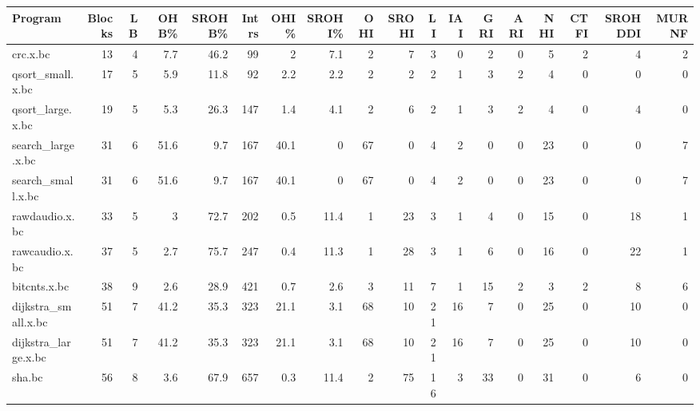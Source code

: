 \begin{tabular}{lrrrrrrrrrrrrrrrrr}
\hline
 Program              &   Blocks &   LB &   OHB\% &   SROHB\% &   Intrs &   OHI\% &   SROHI\% &   OHI &   SROHI &   LI &   IAI &   GRI &   ARI &   NHI &   CTFI &   SROHDDI &   MURNF \\
\hline
 crc.x.bc             &       13 &    4 &    7.7 &     46.2 &      99 &    2   &      7.1 &     2 &       7 &    3 &     0 &     2 &     0 &     5 &      2 &         4 &       2 \\
 qsort\_small.x.bc     &       17 &    5 &    5.9 &     11.8 &      92 &    2.2 &      2.2 &     2 &       2 &    2 &     1 &     3 &     2 &     4 &      0 &         0 &       0 \\
 qsort\_large.x.bc     &       19 &    5 &    5.3 &     26.3 &     147 &    1.4 &      4.1 &     2 &       6 &    2 &     1 &     3 &     2 &     4 &      0 &         4 &       0 \\
 search\_large.x.bc    &       31 &    6 &   51.6 &      9.7 &     167 &   40.1 &      0   &    67 &       0 &    4 &     2 &     0 &     0 &    23 &      0 &         0 &       7 \\
 search\_small.x.bc    &       31 &    6 &   51.6 &      9.7 &     167 &   40.1 &      0   &    67 &       0 &    4 &     2 &     0 &     0 &    23 &      0 &         0 &       7 \\
 rawdaudio.x.bc       &       33 &    5 &    3   &     72.7 &     202 &    0.5 &     11.4 &     1 &      23 &    3 &     1 &     4 &     0 &    15 &      0 &        18 &       1 \\
 rawcaudio.x.bc       &       37 &    5 &    2.7 &     75.7 &     247 &    0.4 &     11.3 &     1 &      28 &    3 &     1 &     6 &     0 &    16 &      0 &        22 &       1 \\
 bitcnts.x.bc         &       38 &    9 &    2.6 &     28.9 &     421 &    0.7 &      2.6 &     3 &      11 &    7 &     1 &    15 &     2 &     3 &      2 &         8 &       6 \\
 dijkstra\_small.x.bc  &       51 &    7 &   41.2 &     35.3 &     323 &   21.1 &      3.1 &    68 &      10 &   21 &    16 &     7 &     0 &    25 &      0 &        10 &       0 \\
 dijkstra\_large.x.bc  &       51 &    7 &   41.2 &     35.3 &     323 &   21.1 &      3.1 &    68 &      10 &   21 &    16 &     7 &     0 &    25 &      0 &        10 &       0 \\
 sha.bc               &       56 &    8 &    3.6 &     67.9 &     657 &    0.3 &     11.4 &     2 &      75 &   16 &     3 &    33 &     0 &    31 &      0 &         6 &       0 \\

\end{tabular}

